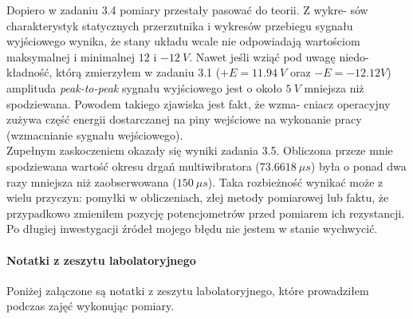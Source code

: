 \documentclass[14pt, table]{extarticle}
\begin{document}
Dopiero w zadaniu 3.4 pomiary przestały pasować do teorii. Z wykre- sów charakterystyk statycznych przerzutnika i wykresów przebiegu sygnału wyjściowego wynika, że stany układu wcale nie odpowiadają wartościom maksymalnej i minimalnej $12$ i $-12 \ V$. Nawet jeśli wziąć pod uwagę niedo- kładność, którą zmierzyłem w zadaniu 3.1 ($+E = 11.94 \ V$ oraz $-E = -12.12 V$) amplituda \textit{peak-to-peak} sygnału wyjściowego jest o około $5 \ V$ mniejsza niż spodziewana. Powodem takiego zjawiska jest fakt, że wzma- cniacz operacyjny zużywa część energii dostarczanej na piny wejściowe na wykonanie pracy (wzmacnianie sygnału wejściowego). \\ 

Zupełnym zaskoczeniem okazały się wyniki zadania 3.5. Obliczona przeze mnie spodziewana wartość okresu drgań multiwibratora ($73.6618 \ \mu s$) była o ponad dwa razy mniejsza niż zaobserwowana ($150 \ \mu s$). Taka rozbieżność wynikać może z wielu przyczyn: pomyłki w obliczeniach, złej metody pomiarowej lub faktu, że przypadkowo zmieniłem pozycję potencjometrów przed pomiarem ich rezystancji. Po długiej inwestygacji źródeł mojego błędu nie jestem w stanie wychwycić.

\newpage
\paragraph{Notatki z zeszytu labolatoryjnego \\}
Poniżej załączone są notatki z zeszytu labolatoryjnego, które prowadziłem podczas zajęć wykonując pomiary.
\end{document}
